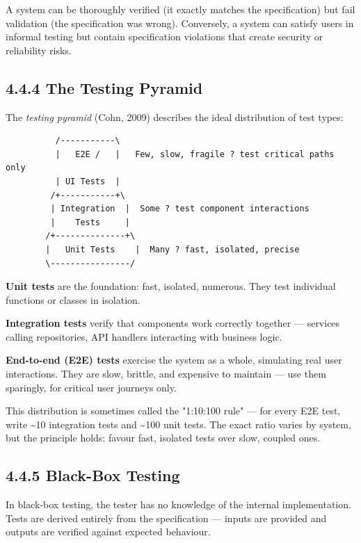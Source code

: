 \documentclass[11pt,a4paper]{book}
\begin{document}
A system can be thoroughly verified (it exactly matches the specification) but fail validation (the specification was wrong). Conversely, a system can satisfy users in informal testing but contain specification violations that create security or reliability risks.

\medskip

\subsection{4.4.4 The Testing Pyramid}

The \textit{testing pyramid} (Cohn, 2009) describes the ideal distribution of test types:

\begin{lstlisting}
          /-----------\
          |   E2E /   |   Few, slow, fragile ? test critical paths only
          | UI Tests  |
         /+-----------+\
         | Integration  |  Some ? test component interactions
         |    Tests     |
        /+--------------+\
        |   Unit Tests    |  Many ? fast, isolated, precise
        \----------------/
\end{lstlisting}

\textbf{Unit tests} are the foundation: fast, isolated, numerous. They test individual functions or classes in isolation.

\textbf{Integration tests} verify that components work correctly together --- services calling repositories, API handlers interacting with business logic.

\textbf{End-to-end (E2E) tests} exercise the system as a whole, simulating real user interactions. They are slow, brittle, and expensive to maintain --- use them sparingly, for critical user journeys only.

This distribution is sometimes called the "1:10:100 rule" --- for every E2E test, write \textasciitilde{}10 integration tests and \textasciitilde{}100 unit tests. The exact ratio varies by system, but the principle holds: favour fast, isolated tests over slow, coupled ones.

\subsection{4.4.5 Black-Box Testing}

In black-box testing, the tester has no knowledge of the internal implementation. Tests are derived entirely from the specification --- inputs are provided and outputs are verified against expected behaviour.
\end{document}
